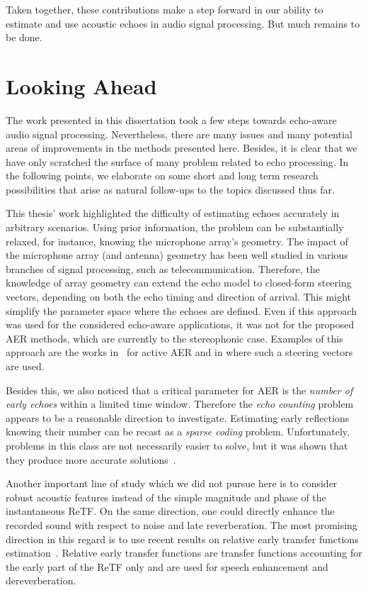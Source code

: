 \mynewline
Taken together, these contributions make a step forward in our ability to estimate and use acoustic echoes in audio signal processing.
But much remains to be done.

\section{Looking Ahead}
The work presented in this dissertation took a few steps towards echo-aware audio signal processing.
Nevertheless, there are many issues and many potential areas of improvements in the methods presented here.
Besides, it is clear that we have only scratched the surface of many problem related to echo processing.
In the following points, we elaborate on some short and long term research possibilities that arise as natural follow-ups to the topics discussed thus far.


This thesis' work highlighted the difficulty of estimating echoes accurately in arbitrary scenarios.
Using prior information, the problem can be substantially relaxed, for instance, knowing the microphone array's geometry.
The impact of the microphone array (and antenna) geometry has been well studied in various branches of signal processing, such as telecommunication.
Therefore, the knowledge of array geometry can extend the echo model to closed-form steering vectors, depending on both the echo timing and direction of arrival.
This might simplify the parameter space where the echoes are defined.
Even if this approach was used for the considered echo-aware applications, it was not for the proposed \ac{AER} methods, which are currently to the stereophonic case.
Examples of this approach are the works in~ for active \acf{AER} and in  where such a steering vectors are used.

\mynewline
Besides this, we also noticed that a critical parameter for \ac{AER} is the \textit{number of early echoes} within a limited time window.
Therefore the \textit{echo counting} problem appears to be a reasonable direction to investigate.
Estimating early reflections knowing their number can be recast as a \textit{sparse coding} problem.
Unfortunately, problems in this class are not necessarily easier to solve, but it was shown that they produce more accurate solutions~.

\mynewline
Another important line of study which we did not pursue here is to consider robust acoustic features instead of the simple magnitude and phase of the instantaneous \ac{ReTF}.
On the same direction, one could directly enhance the recorded sound with respect to noise and late reverberation.
The most promising direction in this regard is to use recent results on relative early transfer functions estimation~.
Relative early transfer functions are transfer functions accounting for the early part of the \ac{ReTF} only and are used for speech enhancement and dereverberation.

